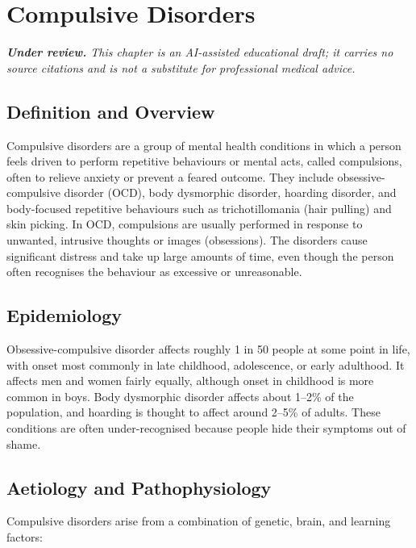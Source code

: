 \chapter{Compulsive Disorders}

\medskip
\noindent\textit{\textbf{Under review.} This chapter is an AI-assisted educational draft; it carries no source citations and is not a substitute for professional medical advice.}

\section*{Definition and Overview}
Compulsive disorders are a group of mental health conditions in which a person feels driven to perform repetitive behaviours or mental acts, called compulsions, often to relieve anxiety or prevent a feared outcome. They include obsessive-compulsive disorder (OCD), body dysmorphic disorder, hoarding disorder, and body-focused repetitive behaviours such as trichotillomania (hair pulling) and skin picking. In OCD, compulsions are usually performed in response to unwanted, intrusive thoughts or images (obsessions). The disorders cause significant distress and take up large amounts of time, even though the person often recognises the behaviour as excessive or unreasonable.

\section*{Epidemiology}
Obsessive-compulsive disorder affects roughly 1 in 50 people at some point in life, with onset most commonly in late childhood, adolescence, or early adulthood. It affects men and women fairly equally, although onset in childhood is more common in boys. Body dysmorphic disorder affects about 1--2\% of the population, and hoarding is thought to affect around 2--5\% of adults. These conditions are often under-recognised because people hide their symptoms out of shame.

\section*{Aetiology and Pathophysiology}
Compulsive disorders arise from a combination of genetic, brain, and learning factors:

